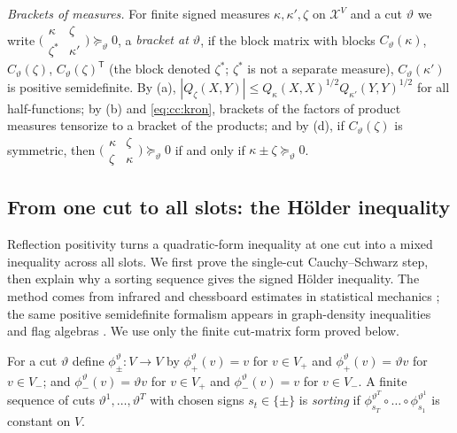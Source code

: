 \emph{Brackets of measures.} For finite signed measures $\kappa,\kappa',\zeta$
on $\mathcal X^V$ and a cut $\vartheta$ we write
$\bigl(\begin{smallmatrix}\kappa&\zeta\\ \zeta^*&\kappa'\end{smallmatrix}\bigr)\succeq_\vartheta0$,
a \emph{bracket at $\vartheta$}, if the block matrix with blocks
$C_\vartheta(\kappa)$, $C_\vartheta(\zeta)$, $C_\vartheta(\zeta)^{\mathsf T}$ (the block denoted $\zeta^*$; $\zeta^*$ is not a separate measure),
$C_\vartheta(\kappa')$ is positive semidefinite. By (a),
$|Q_\zeta(X,Y)|\le Q_\kappa(X,X)^{1/2}Q_{\kappa'}(Y,Y)^{1/2}$ for all
half-functions; by (b) and \eqref{eq:cc:kron}, brackets of the factors of
product measures tensorize to a bracket of the products; and by (d), if
$C_\vartheta(\zeta)$ is symmetric, then
$\bigl(\begin{smallmatrix}\kappa&\zeta\\ \zeta&\kappa\end{smallmatrix}\bigr)\succeq_\vartheta0$
if and only if $\kappa\pm\zeta\succeq_\vartheta0$.

\subsection{From one cut to all slots: the H\"older inequality}\label{subsec:pos:holder}

Reflection positivity turns a quadratic-form inequality at one cut into a
mixed inequality across all slots. We first prove the single-cut
Cauchy--Schwarz step, then explain why a sorting sequence gives the signed
H\"older inequality. The method comes from infrared and chessboard estimates in
statistical mechanics
\cite{FrohlichSimonSpencer76,DysonLiebSimon78,FrohlichLieb,FILS,GlimmJaffe87};
the same positive semidefinite formalism appears in graph-density inequalities
and flag algebras
\cite{ConlonLee,HatamiNorine11,Razborov07,LovaszGraphLimits12,BorgsChayesLovaszSosVesztergombi08}.
We use only the finite cut-matrix form proved below.

\begin{definition}\label{def:sorting}
For a cut $\vartheta$ define $\phi^\vartheta_\pm\colon V\to V$ by
$\phi^\vartheta_+(v)=v$ for $v\in V_+$ and $\phi^\vartheta_+(v)=\vartheta v$ for
$v\in V_-$; and $\phi^\vartheta_-(v)=\vartheta v$ for $v\in V_+$ and
$\phi^\vartheta_-(v)=v$ for $v\in V_-$. A finite sequence of cuts
$\vartheta^1,\dots,\vartheta^T$ with chosen signs $s_t\in\{\pm\}$ is
\emph{sorting} if
$\phi^{\vartheta^T}_{s_T}\circ\dots\circ\phi^{\vartheta^1}_{s_1}$ is constant on
$V$.
\end{definition}

